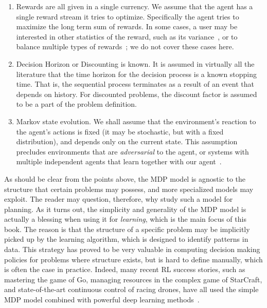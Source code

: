 \begin{enumerate}
    \item Rewards are all given in a single currency. We assume that the agent has a single reward stream it tries to optimize. Specifically the agent tries to maximize the long term sum of rewards. In some cases, a user may be interested in other statistics of the reward, such as its variance~\cite{mannor2013algorithmic}, or to balance multiple types of rewards~\cite{mannor2004geometric}; we do not cover these cases here.
    \item Decision Horizon or Discounting is known. It is assumed in virtually all the literature that the time horizon for the decision process is a known stopping time. That is, the sequential process terminates as a result of an event that depends on history. For discounted problems, the discount factor is assumed to be a part of the problem definition. 
    \item Markov state evolution. We shall assume that the environment's reaction to the agent's actions is fixed (it may be stochastic, but with a fixed distribution), and depends only on the current state. This assumption precludes environments that are \textit{adversarial} to the agent, or systems with multiple independent agents that learn together with our agent~\cite{Cesa-Bianchi-Lugosi-book,Zhang2021}.
\end{enumerate}

As should be clear from the points above, the MDP model is agnostic to the structure that certain problems may possess, and more specialized models may exploit. The reader may question, therefore, why study such a model for planning. As it turns out, the simplicity and generality of the MDP model is actually a blessing when using it for \textit{learning}, which is the main focus of this book. The reason is that the structure of a specific problem may be implicitly picked up by the learning algorithm, which is designed to identify patterns in data. This strategy has proved to be very valuable in computing decision making policies for problems where structure exists, but is hard to define manually, which is often the case in practice. Indeed, many recent RL success stories, such as mastering the game of Go, managing resources in the complex game of StarCraft, and state-of-the-art continuous control of racing drones, have all used the simple MDP model combined with powerful deep learning methods~\cite{silver2016mastering,vinyals2019grandmaster,kaufmann2023champion}.

